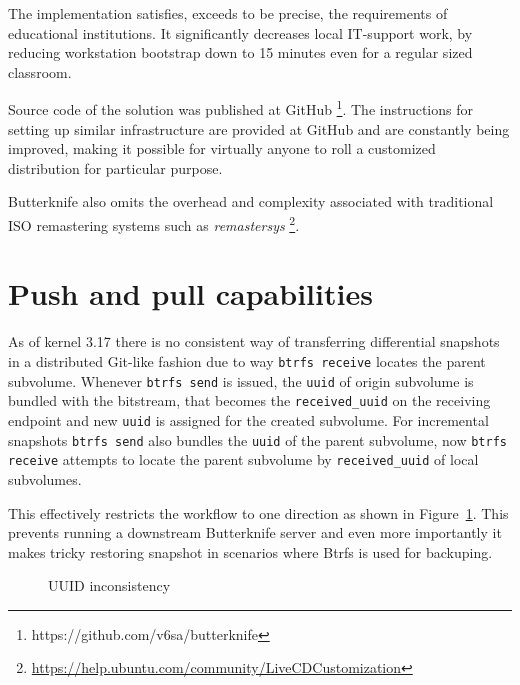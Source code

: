 \documentclass[a4paper,11pt]{kth-mag}
\begin{document}
The implementation satisfies, exceeds to be precise,
the requirements of educational institutions.
It significantly decreases local IT-support work,
by reducing workstation bootstrap down to 15 minutes even for
a regular sized classroom.

Source code of the solution was published at GitHub
\footnote{https://github.com/v6sa/butterknife}.
The instructions for setting up similar infrastructure
are provided at GitHub and are constantly being improved,
making it possible for virtually anyone
to roll a customized distribution
for particular purpose.

Butterknife also omits the overhead
and complexity associated with traditional
ISO remastering systems such as \emph{remastersys}
\footnote{\url{https://help.ubuntu.com/community/LiveCDCustomization}}.


\section{Push and pull capabilities}

As of kernel 3.17 there is no consistent way of transferring
differential snapshots in a distributed Git-like fashion due to way
\texttt{btrfs receive} locates the parent subvolume.
Whenever \texttt{btrfs send} is issued, the \texttt{uuid} of origin
subvolume is bundled with the bitstream, that becomes
the \texttt{received\_uuid} on the receiving endpoint and
new \texttt{uuid} is assigned for the created subvolume.
For incremental snapshots \texttt{btrfs send} also bundles
the \texttt{uuid} of the parent subvolume,
now \texttt{btrfs receive} attempts to locate the parent
subvolume by \texttt{received\_uuid} of local subvolumes.

This effectively restricts the workflow to one direction
as shown in Figure~\ref{fig:btrfs-received-uuid-issue}.
This prevents running a downstream Butterknife server and
even more importantly it makes tricky restoring snapshot
in scenarios where Btrfs is used for backuping.


\begin{figure}[!htb]
\centering
\scalebox{0.5}{}
\caption{UUID inconsistency}
\label{fig:btrfs-received-uuid-issue}
\end{figure}
\end{document}
